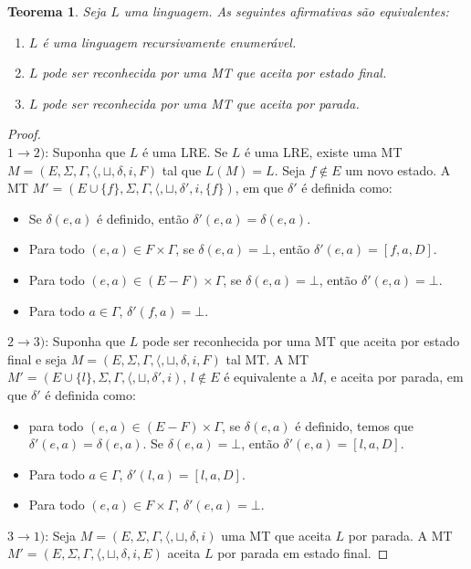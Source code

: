 \documentclass[a4paper]{article}
\newtheorem{Theorem}{Teorema}
\theoremstyle{definition}
\begin{document}
  \begin{Theorem}
    Seja $L$ uma linguagem. As seguintes afirmativas
    são equivalentes:
    \begin{enumerate}
       \item $L$ é uma linguagem recursivamente enumerável.
       \item $L$ pode ser reconhecida por uma MT que aceita por estado final.
       \item $L$ pode ser reconhecida por uma MT que aceita por parada.
    \end{enumerate}
  \end{Theorem}
  \begin{proof}$\:$\\
    $1 \to 2)$: Suponha que $L$ é uma LRE. Se $L$ é uma LRE, existe uma MT
    $M = (E,\Sigma, \Gamma, \langle, \sqcup, \delta, i, F)$ tal que $L(M) = L$.
    Seja $f \not\in E$ um novo estado. A MT $M' = (E \cup \{f\}, \Sigma, \Gamma,
    \langle, \sqcup, \delta',i, \{f\})$, em que $\delta'$ é definida como:
    \begin{itemize}
      \item Se $\delta(e,a)$ é definido, então $\delta'(e,a) = \delta(e,a)$.
      \item Para todo $(e,a) \in F \times \Gamma$, se $\delta(e,a) = \bot$,
        então $\delta'(e,a) = [f, a, D]$.
      \item Para todo $(e,a) \in (E - F) \times \Gamma$, se $\delta(e,a) =
        \bot$, então $\delta'(e,a) = \bot$.
      \item Para todo $a \in \Gamma$, $\delta'(f, a) = \bot$.
    \end{itemize}
    $2 \to 3)$: Suponha que $L$ pode ser reconhecida por uma MT que aceita por
    estado final e seja $M = (E,\Sigma, \Gamma, \langle, \sqcup, \delta, i, F)$
    tal MT. A MT $M' = (E\cup \{l\},\Sigma,\Gamma,\langle, \sqcup, \delta',i)$,
    $l\not\in E$ é equivalente a $M$, e aceita por parada, em que $\delta'$ é
    definida como:
    \begin{itemize}
      \item para todo $(e,a) \in (E - F) \times \Gamma$, se $\delta(e,a)$ é
        definido, temos que $\delta'(e,a) = \delta(e,a)$. Se $\delta(e,a) =
        \bot$, então $\delta'(e,a) = [l,a,D]$.
      \item Para todo $a\in \Gamma$, $\delta'(l,a) = [l,a,D]$.
      \item Para todo $(e,a) \in F \times \Gamma$, $\delta'(e,a) = \bot$. 
    \end{itemize}
    $3 \to 1)$: Seja $M = (E,\Sigma, \Gamma, \langle, \sqcup, \delta, i)$ uma MT
    que aceita $L$ por parada. A MT $M' = (E,\Sigma, \Gamma, \langle, \sqcup,
    \delta, i, E)$ aceita $L$ por parada em estado final.
  \end{proof}
  
\end{document}
